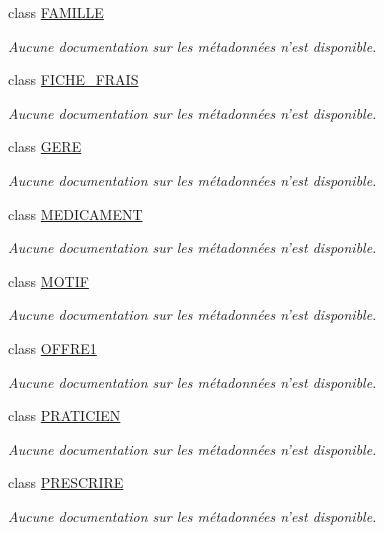 \begin{DoxyCompactItemize}
class \hyperlink{class_model_1_1_f_a_m_i_l_l_e}{F\-A\-M\-I\-L\-L\-E}
\begin{DoxyCompactList}\small\item\em Aucune documentation sur les métadonnées n'est disponible. \end{DoxyCompactList}\item 
class \hyperlink{class_model_1_1_f_i_c_h_e___f_r_a_i_s}{F\-I\-C\-H\-E\-\_\-\-F\-R\-A\-I\-S}
\begin{DoxyCompactList}\small\item\em Aucune documentation sur les métadonnées n'est disponible. \end{DoxyCompactList}\item 
class \hyperlink{class_model_1_1_g_e_r_e}{G\-E\-R\-E}
\begin{DoxyCompactList}\small\item\em Aucune documentation sur les métadonnées n'est disponible. \end{DoxyCompactList}\item 
class \hyperlink{class_model_1_1_m_e_d_i_c_a_m_e_n_t}{M\-E\-D\-I\-C\-A\-M\-E\-N\-T}
\begin{DoxyCompactList}\small\item\em Aucune documentation sur les métadonnées n'est disponible. \end{DoxyCompactList}\item 
class \hyperlink{class_model_1_1_m_o_t_i_f}{M\-O\-T\-I\-F}
\begin{DoxyCompactList}\small\item\em Aucune documentation sur les métadonnées n'est disponible. \end{DoxyCompactList}\item 
class \hyperlink{class_model_1_1_o_f_f_r_e1}{O\-F\-F\-R\-E1}
\begin{DoxyCompactList}\small\item\em Aucune documentation sur les métadonnées n'est disponible. \end{DoxyCompactList}\item 
class \hyperlink{class_model_1_1_p_r_a_t_i_c_i_e_n}{P\-R\-A\-T\-I\-C\-I\-E\-N}
\begin{DoxyCompactList}\small\item\em Aucune documentation sur les métadonnées n'est disponible. \end{DoxyCompactList}\item 
class \hyperlink{class_model_1_1_p_r_e_s_c_r_i_r_e}{P\-R\-E\-S\-C\-R\-I\-R\-E}
\begin{DoxyCompactList}\small\item\em Aucune documentation sur les métadonnées n'est disponible. \end{DoxyCompactList}\item 

\end{DoxyCompactItemize}
